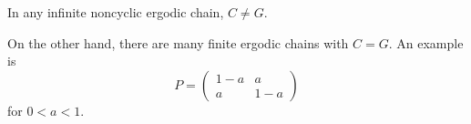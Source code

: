 In any infinite noncyclic ergodic chain, $C \neq G$.

On the other hand, there are many finite ergodic chains with $C = G$. An example is
$$P = \begin{pmatrix} 1 - a & a \\ a & 1 - a \end{pmatrix}$$
for $0 < a < 1$.
